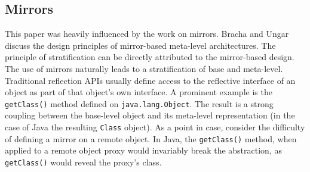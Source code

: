 \documentclass{acm_proc_article-sp}
\newcommand{\noSuchMethod}{\texttt{\_\_noSuchMethod\_\_}}
\begin{document}



\subsection{Mirrors}

This paper was heavily influenced by the work on mirrors. Bracha and Ungar~\cite{bracha04mirrors} discuss the design principles of mirror-based meta-level architectures. The principle of stratification can be directly attributed to the mirror-based design. The use of mirrors naturally leads to a stratification of base and meta-level. Traditional reflection APIs usually define access to the reflective interface of an object as part of that object's own interface. A prominent example is the \texttt{getClass()} method defined on \texttt{java.lang.Object}. The result is a strong coupling between the base-level object and its meta-level representation (in the case of Java the resulting \texttt{Class} object). As a point in case, consider the difficulty of defining a mirror on a remote object. In Java, the \texttt{getClass()} method, when applied to a remote object proxy would invariably break the abstraction, as \texttt{getClass()} would reveal the proxy's class.
\end{document}
